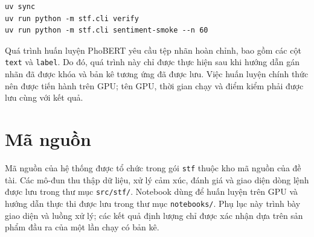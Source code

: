 \documentclass[12pt, a4paper, oneside]{report}
\begin{document}
\begin{verbatim}
uv sync
uv run python -m stf.cli verify
uv run python -m stf.cli sentiment-smoke --n 60
\end{verbatim}

Quá trình huấn luyện PhoBERT yêu cầu tệp nhãn hoàn chỉnh, bao gồm các cột \texttt{text} và \texttt{label}. Do đó, quá trình này chỉ được thực hiện sau khi hướng dẫn gán nhãn đã được khóa và bản kê tương ứng đã được lưu. Việc huấn luyện chính thức nên được tiến hành trên GPU; tên GPU, thời gian chạy và điểm kiểm phải được lưu cùng với kết quả.
\section{Mã nguồn}

Mã nguồn của hệ thống được tổ chức trong gói \texttt{stf} thuộc kho mã nguồn của đề tài.
Các mô-đun thu thập dữ liệu, xử lý cảm xúc, đánh giá và giao diện dòng lệnh được lưu trong thư mục
\texttt{src/stf/}. Notebook dùng để huấn luyện trên GPU và hướng dẫn thực thi được lưu trong thư mục
\texttt{notebooks/}. Phụ lục này trình bày giao diện và luồng xử lý; các kết quả định lượng
chỉ được xác nhận dựa trên sản phẩm đầu ra của một lần chạy có bản kê.
\end{document}
